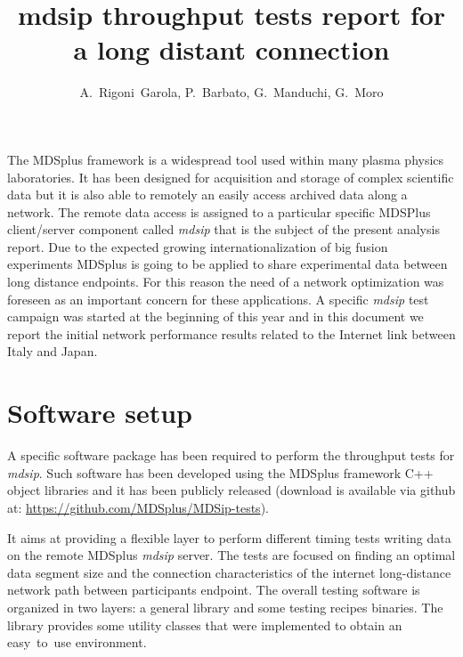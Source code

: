 \documentclass[10pt,a4paper]{article}
\author{ A.~Rigoni~Garola, P.~Barbato, G.~Manduchi, G.~Moro }
\title{mdsip throughput tests report for a long distant connection}
\begin{document}
\maketitle

The MDSplus framework is a widespread tool used within many plasma physics laboratories.
It has been designed for acquisition and storage of complex scientific data but it is also able to remotely an easily access archived data along a network.
The remote data access is assigned to a particular specific MDSPlus  client/server component called \emph{mdsip} that is the subject of the present analysis report.
Due to the expected growing internationalization of big fusion experiments MDSplus is going to be applied to share experimental data between long distance endpoints.
For this reason the need of a network optimization was foreseen as an important concern for these applications.
A specific \emph{mdsip} test campaign was started at the beginning of this year and in this document we report the initial network performance results related to the Internet link between Italy and Japan.

\section{Software setup}

A specific software package has been required to perform the throughput tests for \emph{mdsip}.
Such software has been developed using the MDSplus framework C++ object libraries and it has been publicly released (download is available via github at: \url{https://github.com/MDSplus/MDSip-tests}).

It aims at providing a flexible layer to perform different timing tests writing data on the remote MDSplus \emph{mdsip} server. 
The tests are focused on finding an optimal data segment size and the connection characteristics of the internet long-distance network path between participants endpoint.
The overall testing software is organized in two layers: a general library and some testing recipes binaries. 
The library provides some utility classes that were implemented to obtain an easy~to~use environment.  

\end{document}
